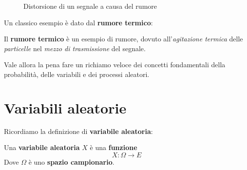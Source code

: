 \begin{figure}[!ht]
\begin{minipage}{0.32\textwidth}
        \centering
    \end{minipage}
    \caption{Distorsione di un segnale a causa del rumore}
    \label{fig:07_01_Rumore}
\end{figure}

Un classico esempio è dato dal \textbf{rumore termico}:

\begin{remark}
    Il \textbf{rumore termico} è un esempio di rumore, dovuto
    all'\textit{agitazione termica} delle \textit{particelle}
    nel \textit{mezzo di trasmissione} del segnale.
\end{remark}

Vale allora la pena fare un richiamo veloce dei concetti fondamentali
della probabilità, delle variabili e dei processi aleatori.

\section{Variabili aleatorie}

Ricordiamo la definizione di \textbf{variabile aleatoria}:

\begin{definition}
    Una \textbf{variabile aleatoria} $X$ è una \textbf{funzione}
    \[
        X: \Omega \to E
    \] 
    Dove $\Omega $ è uno \textbf{spazio campionario}.
\end{definition}

